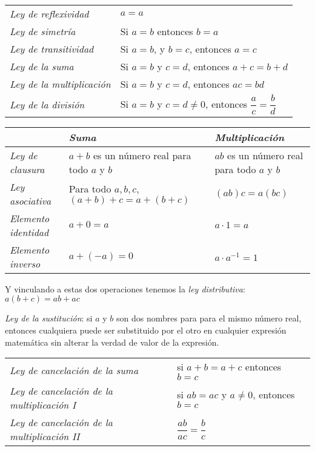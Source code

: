 \begin{center}
    \begin{tabular}{ll}
        \textit{Ley de reflexividad} & $a = a$ \\
        \textit{Ley de simetría} & Si $a = b$ entonces $b = a$ \\
        \textit{Ley de transitividad} &  Si $a = b$, y $b = c$, entonces $a = c$\\
        \textit{Ley de la suma} & Si $a = b$ y $c = d$, entonces $a + c = b + d$ \\
        \textit{Ley de la multiplicación} & Si $a = b$ y $c = d$, entonces $ac = bd$\\
        \textit{Ley de la división} & Si $a = b$ y $c = d \neq 0$, entonces $\dfrac{a}{c} = \dfrac{b}{d}$\\
    \end{tabular}
    \label{tab:ralnumprops1}
\end{center}

\vspace{0.5em}

\begin{center}
    \begin{tabular}{l m{10em} m{10em}}
        & \textit{Suma} & \textit{Multiplicación} \\
        \hline
        \textit{Ley de clausura} & $a + b$ es un número real para todo $a$ y $b$ & $ab$ es un número real para todo $a$ y $b$ \\
        \textit{Ley asociativa} & Para todo $a,b,c$, $(a+b)+c = a+(b+c)$ & $(ab)c = a(bc)$ \\
        \textit{Elemento identidad} & $a + 0 = a$ & $a \cdot 1 = a$ \\
        \textit{Elemento inverso} & $a + (-a) = 0$ & $a \cdot a^{-1} = 1$
    \end{tabular}
    \label{tab:ralnumprops2}
\end{center}

\vspace{0.5em}

Y vinculando a estas dos operaciones tenemos la \textit{ley distributiva}: $a(b +c) = ab + ac$

\textit{Ley de la sustitución}: si $a$ y $b$ son dos nombres para para el mismo número real, entonces cualquiera puede ser substituido por el otro en cualquier expresión matemática sin alterar la verdad de valor de la expresión.

\begin{center}
    \begin{tabular}{ll}
        \textit{Ley de cancelación de la suma} & si $a + b = a + c$ entonces $b = c$ \\
        \textit{Ley de cancelación de la multiplicación I} & si $ab = ac$ y $a \neq 0$, entonces $b = c$ \\
        \textit{Ley de cancelación de la multiplicación II} & $\dfrac{ab}{ac} = \dfrac{b}{c}$
    \end{tabular}
    \label{tab:ralnumprops1}
\end{center}

\clearpage

\nocite{MGECED05}
\nocite{MGECED06}
\nocite{MGECED07}

\printbibliography[heading=subbibliography,title={Bibliografía}]